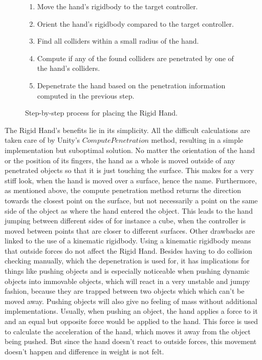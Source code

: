 \begin{figure}[H]
\centering
\small
\begin{enumerate}[noitemsep]
\item Move the hand's rigidbody to the target controller.
\item Orient the hand's rigidbody compared to the target controller.
\item Find all colliders within a small radius of the hand.
\item Compute if any of the found colliders are penetrated by one of the hand's colliders.
\item Depenetrate the hand based on the penetration information computed in the previous step.
\end{enumerate}
\caption{Step-by-step process for placing the Rigid Hand.}
\label{fig:stepByStepRigidHand}
\end{figure}

The Rigid Hand's benefits lie in its simplicity. All the difficult calculations are taken care of by Unity's $ComputePenetration$ method, resulting in a simple implementation but suboptimal solution. No matter the orientation of the hand or the position of its fingers, the hand as a whole is moved outside of any penetrated objects so that it is just touching the surface. This makes for a very stiff look, when the hand is moved over a surface, hence the name. Furthermore, as mentioned above, the compute penetration method returns the direction towards the closest point on the surface, but not necessarily a point on the same side of the object as where the hand entered the object. This leads to the hand jumping between different sides of for instance a cube, when the controller is moved between points that are closer to different surfaces. Other drawbacks are linked to the use of a kinematic rigidbody. Using a kinematic rigidbody means that outside forces do not affect the Rigid Hand. Besides having to do collision checking manually, which the depenetration is used for, it has implications for things like pushing objects and is especially noticeable when pushing dynamic objects into immovable objects, which will react in a very unstable and jumpy fashion, because they are trapped between two objects which which can't be moved away. Pushing objects will also give no feeling of mass without additional implementations. Usually, when pushing an object, the hand applies a force to it and an equal but opposite force would be applied to the hand. This force is used to calculate the acceleration of the hand, which moves it away from the object being pushed. But since the hand doesn't react to outside forces, this movement doesn't happen and difference in weight is not felt.

